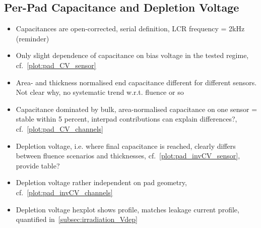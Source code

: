 \subsection{Per-Pad Capacitance and Depletion Voltage}
\label{subsec:QA_Vdep}

\begin{itemize}
	\item Capacitances are open-corrected, serial definition, LCR frequency = 2kHz (reminder)
	\item Only slight dependence of capacitance on bias voltage in the tested regime, cf.~\ref{plot:pad_CV_sensor}
	\item Area- and thickness normalised end capacitance different for different sensors. Not clear why, no systematic trend w.r.t. fluence or so
	\item Capacitance dominated by bulk, area-normalised capacitance on one sensor = stable within 5 percent, interpad contributions can explain differences?, cf.~\ref{plot:pad_CV_channels}
	\item Depletion voltage, i.e. where final capacitance is reached, clearly differs between fluence scenarios and thicknesses, cf.~\ref{plot:pad_invCV_sensor}, provide table?
	\item Depletion voltage rather independent on pad geometry, cf.~\ref{plot:pad_invCV_channels}
	\item Depletion voltage hexplot shows profile, matches leakage current profile, quantified in~\ref{subsec:irradiation_Vdep}
\end{itemize}

